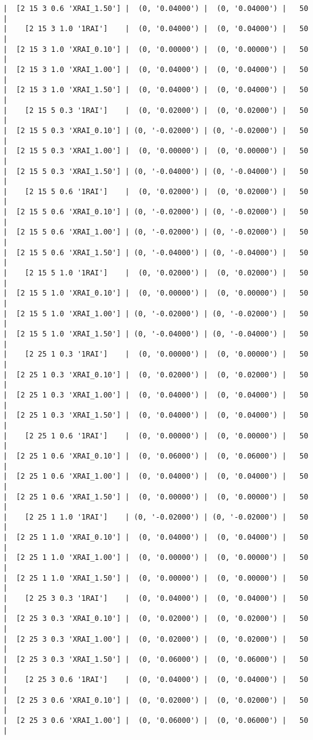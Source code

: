 \documentclass{article}
\begin{document}
\begin{verbatim}
|  [2 15 3 0.6 'XRAI_1.50'] |  (0, '0.04000') |  (0, '0.04000') |   50  |
|    [2 15 3 1.0 '1RAI']    |  (0, '0.04000') |  (0, '0.04000') |   50  |
|  [2 15 3 1.0 'XRAI_0.10'] |  (0, '0.00000') |  (0, '0.00000') |   50  |
|  [2 15 3 1.0 'XRAI_1.00'] |  (0, '0.04000') |  (0, '0.04000') |   50  |
|  [2 15 3 1.0 'XRAI_1.50'] |  (0, '0.04000') |  (0, '0.04000') |   50  |
|    [2 15 5 0.3 '1RAI']    |  (0, '0.02000') |  (0, '0.02000') |   50  |
|  [2 15 5 0.3 'XRAI_0.10'] | (0, '-0.02000') | (0, '-0.02000') |   50  |
|  [2 15 5 0.3 'XRAI_1.00'] |  (0, '0.00000') |  (0, '0.00000') |   50  |
|  [2 15 5 0.3 'XRAI_1.50'] | (0, '-0.04000') | (0, '-0.04000') |   50  |
|    [2 15 5 0.6 '1RAI']    |  (0, '0.02000') |  (0, '0.02000') |   50  |
|  [2 15 5 0.6 'XRAI_0.10'] | (0, '-0.02000') | (0, '-0.02000') |   50  |
|  [2 15 5 0.6 'XRAI_1.00'] | (0, '-0.02000') | (0, '-0.02000') |   50  |
|  [2 15 5 0.6 'XRAI_1.50'] | (0, '-0.04000') | (0, '-0.04000') |   50  |
|    [2 15 5 1.0 '1RAI']    |  (0, '0.02000') |  (0, '0.02000') |   50  |
|  [2 15 5 1.0 'XRAI_0.10'] |  (0, '0.00000') |  (0, '0.00000') |   50  |
|  [2 15 5 1.0 'XRAI_1.00'] | (0, '-0.02000') | (0, '-0.02000') |   50  |
|  [2 15 5 1.0 'XRAI_1.50'] | (0, '-0.04000') | (0, '-0.04000') |   50  |
|    [2 25 1 0.3 '1RAI']    |  (0, '0.00000') |  (0, '0.00000') |   50  |
|  [2 25 1 0.3 'XRAI_0.10'] |  (0, '0.02000') |  (0, '0.02000') |   50  |
|  [2 25 1 0.3 'XRAI_1.00'] |  (0, '0.04000') |  (0, '0.04000') |   50  |
|  [2 25 1 0.3 'XRAI_1.50'] |  (0, '0.04000') |  (0, '0.04000') |   50  |
|    [2 25 1 0.6 '1RAI']    |  (0, '0.00000') |  (0, '0.00000') |   50  |
|  [2 25 1 0.6 'XRAI_0.10'] |  (0, '0.06000') |  (0, '0.06000') |   50  |
|  [2 25 1 0.6 'XRAI_1.00'] |  (0, '0.04000') |  (0, '0.04000') |   50  |
|  [2 25 1 0.6 'XRAI_1.50'] |  (0, '0.00000') |  (0, '0.00000') |   50  |
|    [2 25 1 1.0 '1RAI']    | (0, '-0.02000') | (0, '-0.02000') |   50  |
|  [2 25 1 1.0 'XRAI_0.10'] |  (0, '0.04000') |  (0, '0.04000') |   50  |
|  [2 25 1 1.0 'XRAI_1.00'] |  (0, '0.00000') |  (0, '0.00000') |   50  |
|  [2 25 1 1.0 'XRAI_1.50'] |  (0, '0.00000') |  (0, '0.00000') |   50  |
|    [2 25 3 0.3 '1RAI']    |  (0, '0.04000') |  (0, '0.04000') |   50  |
|  [2 25 3 0.3 'XRAI_0.10'] |  (0, '0.02000') |  (0, '0.02000') |   50  |
|  [2 25 3 0.3 'XRAI_1.00'] |  (0, '0.02000') |  (0, '0.02000') |   50  |
|  [2 25 3 0.3 'XRAI_1.50'] |  (0, '0.06000') |  (0, '0.06000') |   50  |
|    [2 25 3 0.6 '1RAI']    |  (0, '0.04000') |  (0, '0.04000') |   50  |
|  [2 25 3 0.6 'XRAI_0.10'] |  (0, '0.02000') |  (0, '0.02000') |   50  |
|  [2 25 3 0.6 'XRAI_1.00'] |  (0, '0.06000') |  (0, '0.06000') |   50  |

\end{verbatim}
\end{document}
